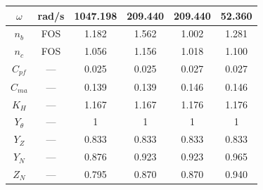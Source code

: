 \begin{tabular}{|c|c|c|c|c|c|}
$\omega$ & rad/s & 1047.198 & 209.440 & 209.440 & 52.360 \\ \hline
$n_b$ & FOS & 1.182 & 1.562 & 1.002 & 1.281 \\ \hline
$n_c$ & FOS & 1.056 & 1.156 & 1.018 & 1.100 \\ \hline
$C_{pf}$ & --- & 0.025 & 0.025 & 0.027 & 0.027 \\ \hline
$C_{ma}$ & --- & 0.139 & 0.139 & 0.146 & 0.146 \\ \hline
$K_H$ & --- & 1.167 & 1.167 & 1.176 & 1.176 \\ \hline
$Y_\theta$ & --- & 1 & 1 & 1 & 1 \\ \hline
$Y_Z$ & --- & 0.833 & 0.833 & 0.833 & 0.833 \\ \hline
$Y_N$ & --- & 0.876 & 0.923 & 0.923 & 0.965 \\ \hline
$Z_N$ & --- & 0.795 & 0.870 & 0.870 & 0.940 \\ \hline

\end{tabular}

